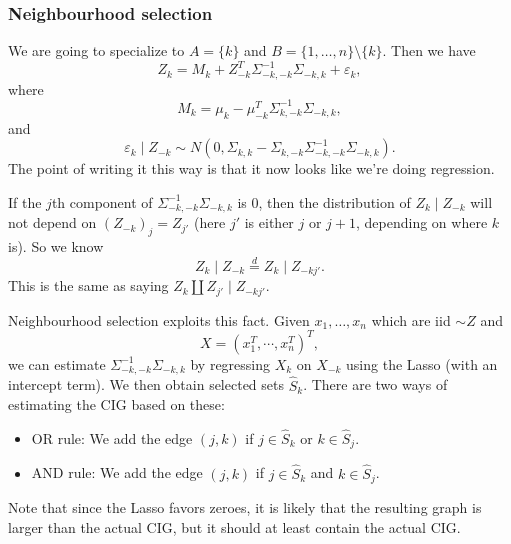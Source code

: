 \documentclass[a4paper]{article}
\begin{document}
\subsubsection*{Neighbourhood selection}
We are going to specialize to $A = \{k\}$ and $B = \{1, \ldots, n\} \setminus \{k\}$. Then we have
\[
  Z_k = M_k + Z_{-k}^T \Sigma_{-k, -k}^{-1} \Sigma_{-k, k} + \varepsilon_k,
\]
where
\[
  M_k = \mu_k - \mu_{-k}^T \Sigma_{k, -k}^{-1} \Sigma_{-k, k},
\]
and
\[
  \varepsilon_k \mid Z_{-k} \sim N(0, \Sigma_{k, k} - \Sigma_{k, -k} \Sigma_{-k, -k}^{-1} \Sigma_{-k, k}).
\]
The point of writing it this way is that it now looks like we're doing regression.

If the $j$th component of $\Sigma_{-k, -k}^{-1} \Sigma_{-k, k}$ is $0$, then the distribution of $Z_k \mid Z_{-k}$ will not depend on $(Z_{-k})_j = Z_{j'}$ (here $j'$ is either $j$ or $j + 1$, depending on where $k$ is). So we know
\[
  Z_k \mid Z_{-k} \overset{d}{=} Z_k \mid Z_{-kj'}.
\]
This is the same as saying $Z_k \amalg Z_{j'} \mid Z_{-kj'}$.

Neighbourhood selection exploits this fact. Given $x_1, \ldots, x_n$ which are iid $\sim Z$ and
\[
  X = (x_1^T, \cdots, x_n^T)^T,
\]
we can estimate $\Sigma_{-k, -k}^{-1} \Sigma_{-k, k}$ by regressing $X_k$ on $X_{-k}$ using the Lasso (with an intercept term). We then obtain selected sets $\hat{S}_k$. There are two ways of estimating the CIG based on these:
\begin{itemize}
  \item OR rule: We add the edge $(j, k)$ if $j \in \hat{S}_k$ or $k \in \hat{S}_j$.
  \item AND rule: We add the edge $(j, k)$ if $j \in \hat{S}_k$ and $k \in \hat{S}_j$.
\end{itemize}
Note that since the Lasso favors zeroes, it is likely that the resulting graph is larger than the actual CIG, but it should at least contain the actual CIG.
\printindex
\end{document}
